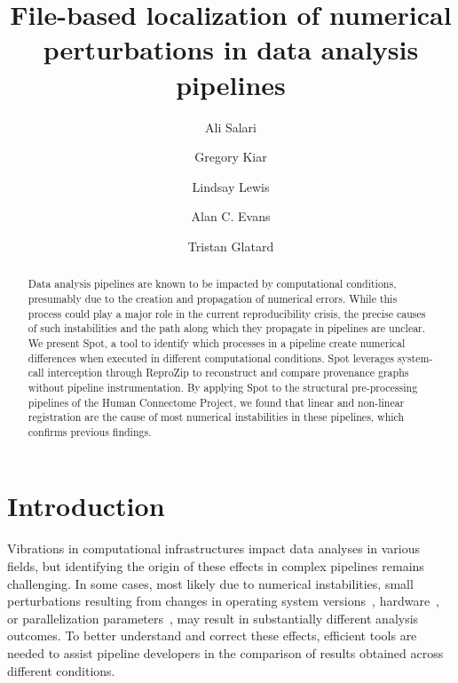 \documentclass[a4paper,num-refs]{oup-contemporary}
\title{File-based localization of numerical perturbations in data analysis pipelines}
\newcommand{\reprozip}[0]{ReproZip\xspace}
\newcommand{\toolname}[0]{Spot\xspace}
\begin{document}
\author[1]{Ali Salari}
\author[2,3]{Gregory Kiar}
\author[2]{Lindsay Lewis}
\author[2,3]{Alan C. Evans}
\author[1]{Tristan Glatard}


\maketitle

\begin{abstract} 
Data analysis pipelines are known to be impacted by computational conditions, presumably due to the creation 
and propagation of numerical errors. While this process could
play a major role in the current reproducibility crisis, the precise
causes of such instabilities and the path along which they propagate in
pipelines are unclear. We present \toolname, a tool to identify which
processes in a pipeline create numerical differences
when executed in different computational conditions. \toolname
leverages system-call interception through \reprozip to reconstruct and compare provenance
graphs without pipeline instrumentation. By applying \toolname to the
structural pre-processing pipelines of the Human Connectome
Project, we found that linear and non-linear registration are the cause of
most numerical instabilities in these pipelines, which confirms previous
findings.
\end{abstract}



\section{Introduction}


Vibrations in computational infrastructures impact data
analyses in various fields, but identifying the origin of these effects in complex pipelines
remains challenging.  In some cases, most likely due to numerical
instabilities, small perturbations resulting from changes in operating
system versions~\cite{Glatard2015}, hardware~\cite{jezequel2015estimation}, or parallelization parameters~\cite{diethelm2011limits},
may result in substantially different analysis outcomes. To better understand and 
correct these effects, efficient tools are 
needed to assist pipeline developers
in the comparison of results obtained across different conditions. 
\end{document}
